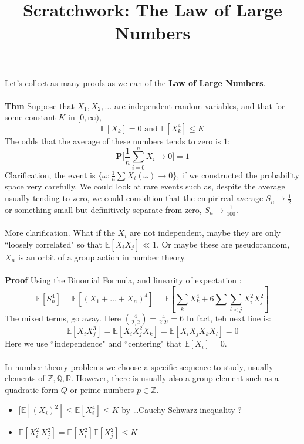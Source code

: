 \documentclass[12pt]{article}
\title{Scratchwork: The Law of Large Numbers}
\date{}
\begin{document}
\sffamily

\maketitle

\noindent Let's collect as many proofs as we can of the \textbf{Law of Large Numbers}. \\ \\
\textbf{Thm} Suppose that $X_1, X_2, \dots$ are independent random variables, and that for some constant $K$ in $[0, \infty)$, 
$$ \mathbb{E}[X_k] = 0 \text{ and } \mathbb{E}[X_k^4] \leq K $$
The odds that the average of these numbers tends to zero is $1$:
$$ \mathbf{P}\bigg[ \frac{1}{n} \sum_{i = 0}^n X_i \to 0 \bigg] = 1$$
Clarification, the event is $\{ \omega: \frac{1}{n} \sum X_i(\omega) \to 0\} $, if we constructed the probability space very carefully.  We could look at rare events such as, despite the average usually tending to zero, we could considtion that the empirircal average $S_n \to \frac{1}{2}$ or something small but definitively separate from zero, $S_n \to \frac{1}{100}$.  \\ \\
More clarification.  What if the $X_i$ are not independent, maybe they are only ``loosely correlated" so that $\mathbb{E}[X_i X_j] \ll 1$. Or maybe these are pseudorandom, $X_n$ is an orbit of a group action in number theory.  \\ \\
\textbf{Proof} Using the Binomial Formula, and {\color{red!50!orange!50!black}linearity of expectation} :
$$ \mathbb{E}[S_n^4] = \mathbb{E}[(X_1 + \dots + X_n)^4] = \mathbb{E}[\sum_k X_k^4 + 6 \sum \sum_{i < j} X_i^2 X_j^2] $$
The mixed terms, go away. Here $\binom{4}{2,2} = \frac{4}{2!2!}= 6 $ In fact, teh next line is:
$$ \mathbb{E}[X_i X_j^3]  = \mathbb{E}[X_i X_j^2 X_k] = \mathbb{E} [X_i X_j X_k X_l] = 0 $$
Here we use ``independence" and ``centering" that $\mathbb{E}[X_i] = 0$.  \\ \\
In number theory problems we choose a specific sequence to study, usually elements of $\mathbb{Z}, \mathbb{Q}, \mathbb{R}$.  However, there is usually also a group element such as a quadratic form $Q$ or prime numbers $p \in \mathbb{Z}$. 
\begin{itemize}
\item $[\mathbb{E}[(X_i)^2] \leq \mathbb{E}[X_i^4] \leq K$ by \dots Cauchy-Schwarz inequality ?
\item $\mathbb{E}[X_i^2 \, X_j^2] = \mathbb{E}[X_i^2] \mathbb{E}[X_j^2] \leq K  $
\end{itemize}
\end{document}
